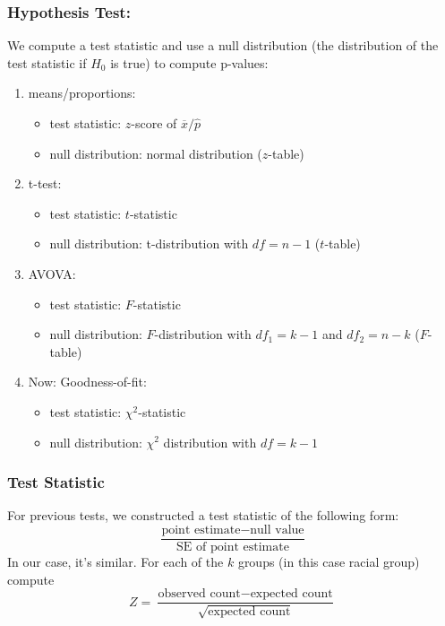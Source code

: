 \documentclass[handout]{beamer}
\newcommand{\blue}[1]{\textcolor{blue2}{#1}}
\newcommand{\xbar}{\overline{x}}
\begin{document}
\begin{frame}[fragile]
\frametitle{Hypothesis Test:  }

We compute a \blue{test statistic} and use a \blue{null distribution} (the distribution of the test statistic if $H_0$ is true) to compute p-values:

\begin{enumerate}
\pause\item \blue{means/proportions}:
\begin{itemize}
\item test statistic: $z$-score of $\xbar / \widehat{p}$
\item null distribution: normal distribution ($z$-table)
\end{itemize}
\pause\item \blue{t-test}:  
\begin{itemize}
\item test statistic: $t$-statistic
\item null distribution: t-distribution with $df=n-1$ ($t$-table)
\end{itemize}
\pause\item \blue{AVOVA}:  
\begin{itemize}
\item test statistic: $F$-statistic 
\item null distribution: $F$-distribution with $df_1=k-1$ and $df_2 = n-k$ ($F$-table)
\end{itemize}
\pause\item Now: \blue{Goodness-of-fit}:
\begin{itemize}
\item test statistic: $\chi^2$-statistic
\item null distribution: $\chi^2$ distribution with $df=k-1$
\end{itemize}
\end{enumerate}

\end{frame}


\begin{frame}[fragile]
\frametitle{Test Statistic}

For previous tests, we constructed a test statistic of the following form:  
\[
\frac{\mbox{point estimate} - \mbox{null value}}{\mbox{SE of point estimate}}
\]
\pause In our case, it's similar.  For each of the $k$ groups (in this case racial group) compute
\[
Z = \frac{\mbox{observed count} - \mbox{expected count}}{\sqrt{\mbox{expected count}}}
\]
\end{frame}
\end{document}
